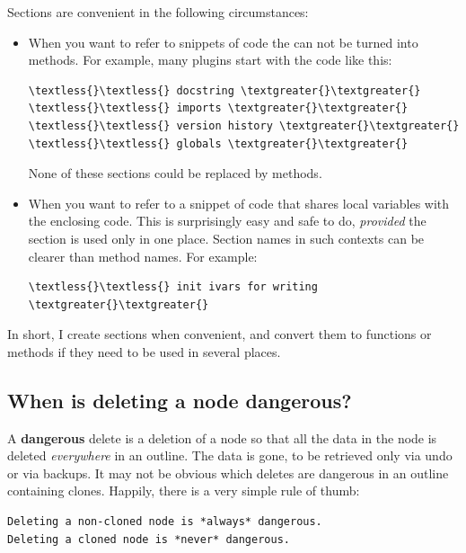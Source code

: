 \documentclass[a4paper,10pt,english]{sphinxmanual}
\begin{document}
Sections are convenient in the following circumstances:
\begin{itemize}
\item {} 
When you want to refer to snippets of code the can not be turned into methods.
For example, many plugins start with the code like this:

\begin{Verbatim}[commandchars=\\\{\}]
\textless{}\textless{} docstring \textgreater{}\textgreater{}
\textless{}\textless{} imports \textgreater{}\textgreater{}
\textless{}\textless{} version history \textgreater{}\textgreater{}
\textless{}\textless{} globals \textgreater{}\textgreater{}
\end{Verbatim}

None of these sections could be replaced by methods.

\item {} 
When you want to refer to a snippet of code that shares local variables with the enclosing code.
This is surprisingly easy and safe to do, \emph{provided} the section is used only in one place.
Section names in such contexts can be clearer than method names.  For example:

\begin{Verbatim}[commandchars=\\\{\}]
\textless{}\textless{} init ivars for writing \textgreater{}\textgreater{}
\end{Verbatim}

\end{itemize}

In short, I create sections when convenient,
and convert them to functions or methods if they need to be used in several places.


\subsection{When is deleting a node dangerous?}
\label{FAQ:when-is-deleting-a-node-dangerous}
A \textbf{dangerous} delete is a deletion of a node so that all the data in the node
is deleted \emph{everywhere} in an outline. The data is gone, to be retrieved only
via undo or via backups. It may not be obvious which deletes are dangerous in an
outline containing clones. Happily, there is a very simple rule of thumb:

\begin{Verbatim}[commandchars=\\\{\}]
Deleting a non-cloned node is *always* dangerous.
Deleting a cloned node is *never* dangerous.
\end{Verbatim}
\end{document}
